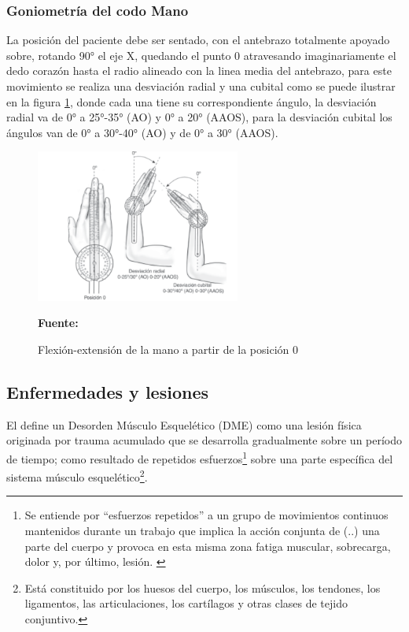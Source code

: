 \subsubsection{Goniometría del codo Mano}
La posición del paciente debe ser sentado, con el antebrazo totalmente apoyado sobre, rotando 90° el eje X, quedando el punto 0 atravesando imaginariamente el dedo corazón hasta el radio alineado con la linea media del antebrazo, para este movimiento se realiza una desviación radial y una cubital como se puede ilustrar en la figura \ref{GONIOMETRIA_MANO}, donde cada una tiene su correspondiente ángulo, la desviación radial va de 0° a 25°-35° (AO)  y 0° a 20° (AAOS), para la desviación cubital los ángulos van de 0° a 30°-40° (AO) y de 0° a 30° (AAOS). \parencite{Taboadela2007TaboadelaLaborales.}

\begin{figure}[H]
    \centering
    \includegraphics[width=0.6\textwidth]{Anexos/LATEX/chapters/images/goniometria_mano.png}
    \caption{Flexión-extensión de la mano a partir de la posición 0}
    \small{\textbf{Fuente:} \parencite{Taboadela2007TaboadelaLaborales.} }
    \label{GONIOMETRIA_MANO}
\end{figure}


\subsection{Enfermedades y lesiones}
El \parencite{MinisteriodeProteccionSocialdeColombia2006GuiaSuperiores} define un Desorden Músculo Esquelético (DME) como una lesión física originada por trauma acumulado que se desarrolla gradualmente sobre un período de tiempo; como resultado de repetidos esfuerzos\footnote{Se entiende por “esfuerzos repetidos” a un grupo de movimientos continuos mantenidos durante un trabajo que implica la acción conjunta de (..) una parte del cuerpo y provoca en esta misma zona fatiga muscular, sobrecarga, dolor y, por último, lesión.  \parencite{INSHT2016PrevencionRepetidos}} sobre una parte específica del sistema músculo esquelético\footnote{Está constituido por los huesos del cuerpo, los músculos, los tendones, los ligamentos, las articulaciones, los cartílagos y otras clases de tejido conjuntivo.}. 

